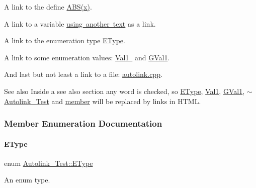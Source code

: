 A link to the define \mbox{\hyperlink{autolink_8cpp_a996f7be338ccb40d1a2a5abc1ad61759}{A\+B\+S(x)}}.

A link to a variable \mbox{\hyperlink{class_autolink___test_a8de85603114bc9b9e53bd40764e9b499}{using another text}} as a link.

A link to the enumeration type \mbox{\hyperlink{class_autolink___test_aeb611627c332d067bded1806b1bb45c2}{E\+Type}}.

A link to some enumeration values\+: \mbox{\hyperlink{class_autolink___test_aeb611627c332d067bded1806b1bb45c2af70631e295bce280e74762d18af47a94}{Val1 }} and \mbox{\hyperlink{autolink_8cpp_a656d63cf384d2a6f23c2c18523a7bc5ea0f016f49e4f3bcd072319b9d68bc927d}{G\+Val1}}.

And last but not least a link to a file\+: \mbox{\hyperlink{autolink_8cpp}{autolink.\+cpp}}.

\begin{DoxySeeAlso}{See also}
Inside a see also section any word is checked, so \mbox{\hyperlink{class_autolink___test_aeb611627c332d067bded1806b1bb45c2}{E\+Type}}, \mbox{\hyperlink{class_autolink___test_aeb611627c332d067bded1806b1bb45c2af70631e295bce280e74762d18af47a94}{Val1}}, \mbox{\hyperlink{autolink_8cpp_a656d63cf384d2a6f23c2c18523a7bc5ea0f016f49e4f3bcd072319b9d68bc927d}{G\+Val1}}, \mbox{\hyperlink{class_autolink___test_a03bf46c8e2b733680035f524fd7b193b}{$\sim$\+Autolink\+\_\+\+Test}} and \mbox{\hyperlink{class_autolink___test_a393ea281f235a2f603d98daf72b0d411}{member}} will be replaced by links in H\+T\+ML. 
\end{DoxySeeAlso}


\subsubsection{Member Enumeration Documentation}
\mbox{\label{class_autolink___test_aeb611627c332d067bded1806b1bb45c2}} 
\paragraph{\texorpdfstring{EType}{EType}}
{\footnotesize\ttfamily enum \mbox{\hyperlink{class_autolink___test_aeb611627c332d067bded1806b1bb45c2}{Autolink\+\_\+\+Test\+::\+E\+Type}}}



An enum type. 


